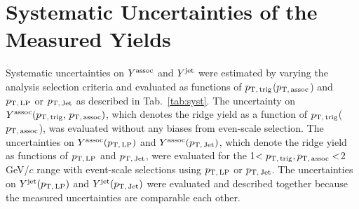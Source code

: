 

\section{Systematic Uncertainties of the Measured Yields}
\label{sec:uncertainties}

Systematic uncertainties on $Y^{\rm{assoc}}$ and $Y^{\rm{jet}}$ were estimated by varying the analysis selection criteria and evaluated as functions of $p_\mathrm{T,\,trig}$($p_\mathrm{T,\,assoc}$) and $p_\mathrm{T,\,LP}$ or $p_\mathrm{T,\,Jet}$ as described in Tab.~\ref{tab:syst}. The uncertainty on $Y^{\rm{assoc}}(p_\mathrm{T,\,trig},\,p_\mathrm{T,\,assoc})$, which denotes the ridge yield as a function of $p_\mathrm{T,\,trig}$($p_\mathrm{T,\,assoc}$), was evaluated without any biases from even-scale selection. The uncertainties on $Y^{\rm{assoc}}(p_\mathrm{T,\,LP})$ and $Y^{\rm{assoc}}(p_\mathrm{T,\,Jet})$, which denote the ridge yield as functions of $p_\mathrm{T,\,LP}$ and $p_\mathrm{T,\,Jet}$, were evaluated for the 1$<p_\mathrm{T,\,trig}, p_\mathrm{T,\,assoc}<$2 GeV/$c$ range with event-scale selections using $p_\mathrm{T,\,LP}$ or $p_\mathrm{T,\,Jet}$. The uncertainties on $Y^{\rm{jet}}(p_\mathrm{T,\,LP})$ and $Y^{\rm{jet}}(p_\mathrm{T,\,Jet})$ were evaluated and described together because the measured uncertainties are comparable each other.

